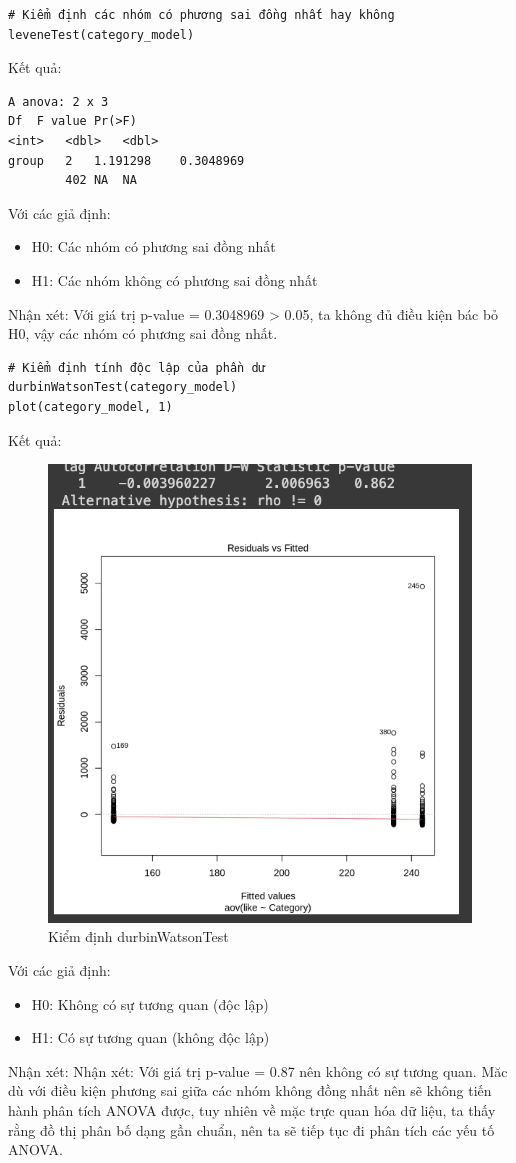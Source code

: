 \begin{itemize}
\begin{itemize}
    \begin{lstlisting}
# Kiểm định các nhóm có phương sai đồng nhất hay không
leveneTest(category_model)
    \end{lstlisting}
Kết quả:
\begin{lstlisting}
A anova: 2 x 3
Df	F value	Pr(>F)
<int>	<dbl>	<dbl>
group	2	1.191298	0.3048969
        402	NA	NA

\end{lstlisting}
Với các giả định:
    \begin{itemize}
        \item H0: Các nhóm có phương sai đồng nhất
        \item H1: Các nhóm không có phương sai đồng nhất
    \end{itemize}
Nhận xét: Với giá trị p-value = 0.3048969 > 0.05, ta không đủ điều kiện bác bỏ H0, vậy các nhóm có phương sai đồng nhất.

\begin{lstlisting}
# Kiểm định tính độc lập của phần dư
durbinWatsonTest(category_model)
plot(category_model, 1)
\end{lstlisting}

Kết quả:
\begin{figure}
    \centering
    \includegraphics[width=0.8\linewidth]{part23_figures/19.png}
    \caption{Kiểm định durbinWatsonTest}
    \label{fig:Kiểm định durbinWatsonTest_}
\end{figure}
Với các giả định:
    \begin{itemize}
        \item H0: Không có sự tương quan (độc lập)
        \item H1: Có sự tương quan (không độc lập)
    \end{itemize}
Nhận xét: Nhận xét: Với giá trị p-value = 0.87 nên không có sự tương quan.
Măc dù với điều kiện phương sai giữa các nhóm không đồng nhất nên sẽ không tiến hành phân tích ANOVA được, tuy nhiên về mặc trực quan hóa dữ liệu, ta thấy rằng đồ thị phân bố dạng gần chuẩn, nên ta sẽ tiếp tục đi phân tích các yếu tố ANOVA.


\end{itemize}
\end{itemize}
